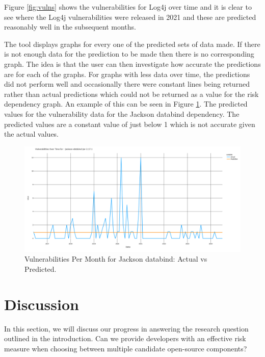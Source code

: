 \documentclass[conference]{IEEEtran}
\begin{document}
Figure \ref{fig:vulns} shows the vulnerabilities for Log4j over time and it is clear to see where the Log4j vulnerabilities were released in 2021 and these are predicted reasonably well in the subsequent months. 

The tool displays graphs for every one of the predicted sets of data made. If there is not enough data for the prediction to be made then there is no corresponding graph. The idea is that the user can then investigate how accurate the predictions are for each of the graphs. For graphs with less data over time, the predictions did not perform well and occasionally there were constant lines being returned rather than actual predictions which could not be returned as a value for the risk dependency graph. An example of this can be seen in Figure \ref{fig:const}. The predicted values for the vulnerability data for the Jackson databind dependency. The predicted values are a constant value of just below 1 which is not accurate given the actual values. 

\begin{figure}
    \centering
    \includegraphics[width=1\linewidth]{Const.png}
    \caption{Vulnerabilities Per Month for Jackson databind: Actual vs Predicted.} 
    \label{fig:const}
\end{figure}

\section{Discussion}
In this section, we will discuss our progress in answering the research question outlined in the introduction. Can we provide developers with an effective risk measure when choosing between multiple candidate open-source components?
\end{document}
